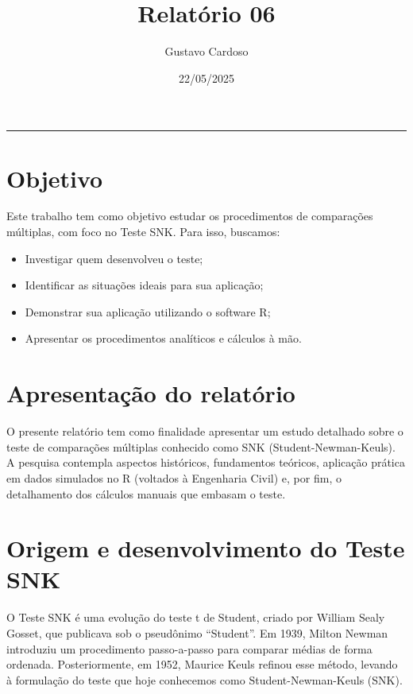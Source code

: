 \documentclass[
]{article}
\title{Relatório 06}
\author{Gustavo Cardoso}
\date{22/05/2025}
\begin{document}
\maketitle

\renewcommand*\contentsname{Sumário}
{
\setcounter{tocdepth}{2}
\tableofcontents
}
\begin{center}\rule{0.5\linewidth}{0.5pt}\end{center}

\section{Objetivo}\label{objetivo}

Este trabalho tem como objetivo estudar os procedimentos de comparações
múltiplas, com foco no Teste SNK. Para isso, buscamos:

\begin{itemize}
\item
  Investigar quem desenvolveu o teste;
\item
  Identificar as situações ideais para sua aplicação;
\item
  Demonstrar sua aplicação utilizando o software R;
\item
  Apresentar os procedimentos analíticos e cálculos à mão.
\end{itemize}

\section{Apresentação do
relatório}\label{apresentauxe7uxe3o-do-relatuxf3rio}

O presente relatório tem como finalidade apresentar um estudo detalhado
sobre o teste de comparações múltiplas conhecido como SNK
(Student-Newman-Keuls). A pesquisa contempla aspectos históricos,
fundamentos teóricos, aplicação prática em dados simulados no R
(voltados à Engenharia Civil) e, por fim, o detalhamento dos cálculos
manuais que embasam o teste.

\section{Origem e desenvolvimento do Teste
SNK}\label{origem-e-desenvolvimento-do-teste-snk}

O Teste SNK é uma evolução do teste t de Student, criado por William
Sealy Gosset, que publicava sob o pseudônimo ``Student''. Em 1939,
Milton Newman introduziu um procedimento passo-a-passo para comparar
médias de forma ordenada. Posteriormente, em 1952, Maurice Keuls refinou
esse método, levando à formulação do teste que hoje conhecemos como
Student-Newman-Keuls (SNK).
\end{document}
